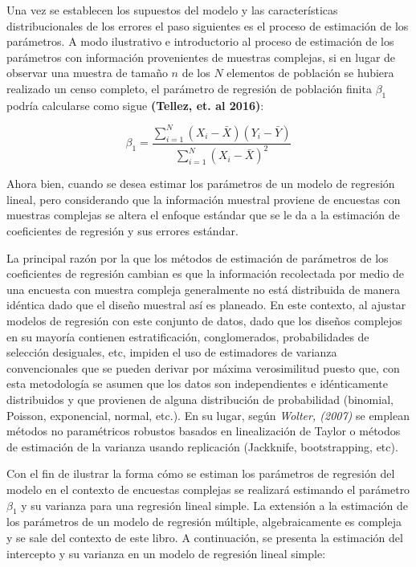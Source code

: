 \documentclass[
  12pt,
]{book}
\begin{document}
Una vez se establecen los supuestos del modelo y las características distribucionales de los errores el paso siguientes es el proceso de estimación de los parámetros. A modo ilustrativo e introductorio al proceso de estimación de los parámetros con información provenientes de muestras complejas, si en lugar de observar una muestra de tamaño \(n\) de los \(N\) elementos de población se hubiera realizado un censo completo, el parámetro de regresión de población finita \(\beta_{1}\) podría calcularse como sigue \textbf{(Tellez, et. al 2016)}:

\[
\beta_{1}  =  \frac{{ \sum_{i=1}^{N}\left(X_{i}-\bar{X}\right)\left(Y_{i}-\bar{Y}\right)}}{\sum_{i=1}^{N}\left(X_{i}-\bar{X}\right)^{2}}
\]

Ahora bien, cuando se desea estimar los parámetros de un modelo de regresión lineal, pero considerando que la información muestral proviene de encuestas con muestras complejas se altera el enfoque estándar que se le da a la estimación de coeficientes de regresión y sus errores estándar.

La principal razón por la que los métodos de estimación de parámetros de los coeficientes de regresión cambian es que la información recolectada por medio de una encuesta con muestra compleja generalmente no está distribuida de manera idéntica dado que el diseño muestral así es planeado. En este contexto, al ajustar modelos de regresión con este conjunto de datos, dado que los diseños complejos en su mayoría contienen estratificación, conglomerados, probabilidades de selección desiguales, etc, impiden el uso de estimadores de varianza convencionales que se pueden derivar por máxima verosimilitud puesto que, con esta metodología se asumen que los datos son independientes e idénticamente distribuidos y que provienen de alguna distribución de probabilidad (binomial, Poisson, exponencial, normal, etc.). En su lugar, según \emph{Wolter, (2007)} se emplean métodos no paramétricos robustos basados en linealización de Taylor o métodos de estimación de la varianza usando replicación (Jackknife, bootstrapping, etc).

Con el fin de ilustrar la forma cómo se estiman los parámetros de regresión del modelo en el contexto de encuestas complejas se realizará estimando el parámetro \(\beta_{1}\) y su varianza para una regresión lineal simple. La extensión a la estimación de los parámetros de un modelo de regresión múltiple, algebraicamente es compleja y se sale del contexto de este libro. A continuación, se presenta la estimación del intercepto y su varianza en un modelo de regresión lineal simple:
\end{document}
